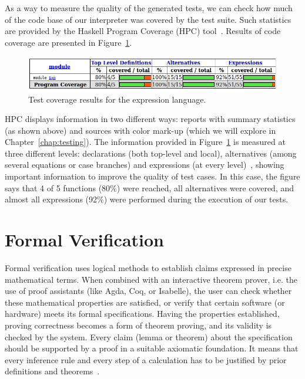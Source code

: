 \documentclass[tese,capa,english]{texufpel}
\begin{document}
As a way to measure the quality of the generated tests, we can check how much of the code base of our interpreter was covered by the test suite. Such statistics are provided by the Haskell Program Coverage (HPC) tool~\cite{Gill:2007:HPC:1291201.1291203}. Results of code coverage are presented in Figure~\ref{fig:coverage-exp}.

\begin{figure}[!htb]
\centering
\includegraphics[width=0.95\linewidth]{Images/coverage_exp}
\caption{Test coverage results for the expression language.}
\label{fig:coverage-exp}
\end{figure}

HPC displays information in two different ways: reports with summary statistics (as shown above) and sources with color mark-up (which we will explore in Chapter~\ref{chap:testing}). The information provided in Figure~\ref{fig:coverage-exp} is measured at three different levels: declarations (both top-level and local), alternatives (among several equations or case branches) and expressions (at every level)~\cite{Gill:2007:HPC:1291201.1291203}, showing important information to improve the quality of test cases. In this case, the figure says that 4 of 5 functions (80\%) were reached, all alternatives were covered, and almost all expressions (92\%) were performed during the execution of our tests.















\section{Formal Verification}
\label{sec:itp}

Formal verification uses logical methods to establish claims expressed in precise mathematical terms. When combined with an interactive theorem prover, i.e. the use of proof assistants (like Agda, Coq, or Isabelle), the user can check whether these mathematical properties are satisfied, or verify that certain software (or hardware) meets its formal specifications. Having the properties established, proving correctness becomes a form of theorem proving, and its validity is checked by the system. Every claim (lemma or theorem) about the specification should be supported by a proof in a suitable axiomatic foundation. It means that every inference rule and every step of a calculation has to be justified by prior definitions and theorems~\cite{de2015lean}.
\end{document}

